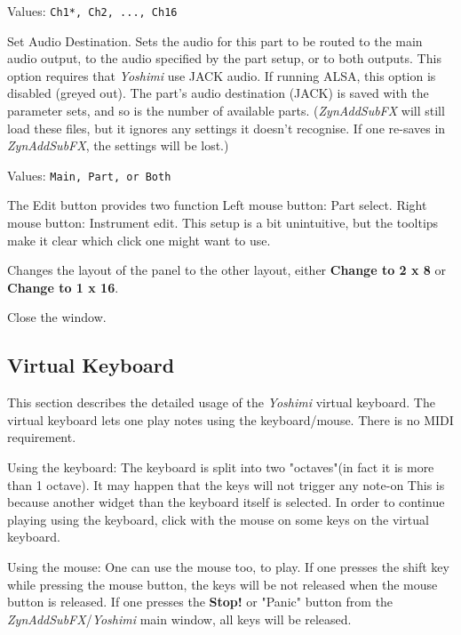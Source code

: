    Values: \texttt{Ch1*, Ch2, ..., Ch16}

   Set Audio Destination.
   Sets the audio for this part to be routed to the main audio output, to
   the audio specified by the part setup, or to both outputs.
   This option requires that \textsl{Yoshimi} use JACK audio.  If running
   ALSA, this option is disabled (greyed out).
   The part's audio destination (JACK) is saved with the parameter sets, and
   so is the number of available parts.  (\textsl{ZynAddSubFX} will still
   load these files, but it ignores any settings it doesn't recognise. If
   one re-saves in \textsl{ZynAddSubFX}, the settings will be lost.)

   Values: \texttt{Main, Part, or Both}

   The Edit button provides two function
   Left mouse button: Part select.
   Right mouse button: Instrument edit.
   This setup is a bit unintuitive, but the tooltips make it clear
   which click one might want to use.

   Changes the layout of the panel to the other layout, either
   \textbf{Change to 2 x 8} or
   \textbf{Change to 1 x 16}.

   Close the window.

\subsection{Virtual Keyboard}
\label{subsec:virtual_keyboard}

   This section describes the detailed usage of the
   \textsl{Yoshimi} virtual keyboard.
   The virtual keyboard lets one play notes using the keyboard/mouse. There is
   no MIDI requirement. 
    
   Using the keyboard: The keyboard is split into two "octaves"(in fact it is
   more than 1 octave). It may happen that the keys will not trigger any
   note-on This is because another widget than the keyboard itself is selected.
   In order to continue playing using the keyboard, click with the mouse on
   some keys on the virtual keyboard.
   
   Using the mouse: One can use the mouse too, to play.
   If one presses the shift key while pressing the mouse button,
   the keys will be not released when the mouse button is released.  If one
   presses the \textbf{Stop!} or "Panic" button from the
   \textsl{ZynAddSubFX}/\textsl{Yoshimi}
   main window, all keys will be released. 


